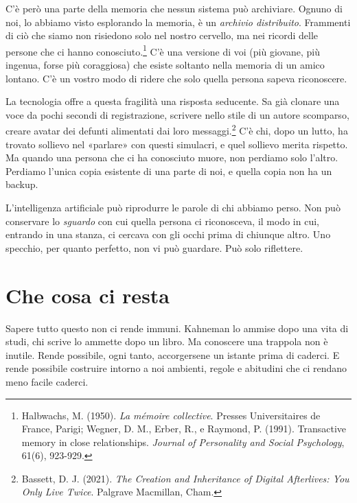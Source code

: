 C'è però una parte della memoria che nessun sistema può archiviare. Ognuno di noi, lo abbiamo visto esplorando la memoria, è un \textit{archivio distribuito}. Frammenti di ciò che siamo non risiedono solo nel nostro cervello, ma nei ricordi delle persone che ci hanno conosciuto.\footnote{Halbwachs, M. (1950). \textit{La mémoire collective}. Presses Universitaires de France, Parigi; Wegner, D. M., Erber, R., e Raymond, P. (1991). Transactive memory in close relationships. \textit{Journal of Personality and Social Psychology}, 61(6), 923-929.} C'è una versione di voi (più giovane, più ingenua, forse più coraggiosa) che esiste soltanto nella memoria di un amico lontano. C'è un vostro modo di ridere che solo quella persona sapeva riconoscere.

La tecnologia offre a questa fragilità una risposta seducente. Sa già clonare una voce da pochi secondi di registrazione, scrivere nello stile di un autore scomparso, creare avatar dei defunti alimentati dai loro messaggi.\footnote{Bassett, D. J. (2021). \textit{The Creation and Inheritance of Digital Afterlives: You Only Live Twice}. Palgrave Macmillan, Cham.} C'è chi, dopo un lutto, ha trovato sollievo nel «parlare» con questi simulacri, e quel sollievo merita rispetto. Ma quando una persona che ci ha conosciuto muore, non perdiamo solo l'altro. Perdiamo l'unica copia esistente di una parte di noi, e quella copia non ha un backup.


L'intelligenza artificiale può riprodurre le parole di chi abbiamo perso. Non può conservare lo \textit{sguardo} con cui quella persona ci riconosceva, il modo in cui, entrando in una stanza, ci cercava con gli occhi prima di chiunque altro. Uno specchio, per quanto perfetto, non vi può guardare. Può solo riflettere.

\section*{Che cosa ci resta}

Sapere tutto questo non ci rende immuni. Kahneman lo ammise dopo una vita di studi, chi scrive lo ammette dopo un libro. Ma conoscere una trappola non è inutile. Rende possibile, ogni tanto, accorgersene un istante prima di caderci. E rende possibile costruire intorno a noi ambienti, regole e abitudini che ci rendano meno facile caderci.

